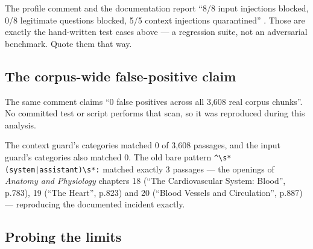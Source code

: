 \begin{caution}
The  profile comment and the documentation report \enquote{8/8 input injections blocked, 0/8 legitimate questions blocked, 5/5 context injections quarantined} . Those are exactly the hand-written test cases above --- a regression suite, not an adversarial benchmark. Quote them that way.
\end{caution}

\subsection{The corpus-wide false-positive claim}

The same comment claims \enquote{0 false positives across all 3,608 real corpus chunks}. No committed test or script performs that scan, so it was reproduced during this analysis.

\begin{measured}
The context guard's categories matched 0 of 3,608 passages, and the input guard's categories also matched 0. The old bare pattern \lstinline~^\s*(system|assistant)\s*:~ matched exactly 3 passages --- the openings of \emph{Anatomy and Physiology} chapters 18 (\enquote{The Cardiovascular System: Blood}, p.783), 19 (\enquote{The Heart}, p.823) and 20 (\enquote{Blood Vessels and Circulation}, p.887) --- reproducing the documented incident exactly.
\end{measured}

\subsection{Probing the limits}

